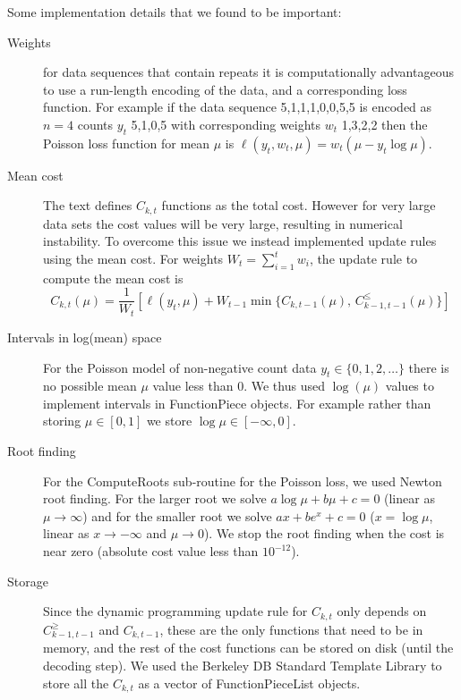 \documentclass{article}
\begin{document}
Some implementation details that we found to be important:
\begin{description}
\item[Weights] for data sequences that contain repeats it is
  computationally advantageous to use a run-length encoding of the
  data, and a corresponding loss function. For example if the data
  sequence 5,1,1,1,0,0,5,5 is encoded as $n=4$ counts $y_t$ 5,1,0,5 with
  corresponding weights $w_t$ 1,3,2,2 then the Poisson loss function
  for mean $\mu$ is $\ell(y_t, w_t, \mu) = w_t(\mu- y_t\log \mu)$.
\item[Mean cost] The text defines $C_{k,t}$ functions as the total
  cost. However for very large data sets the cost values will be very
  large, resulting in numerical instability. To overcome this issue we
  instead implemented update rules using the mean cost.  For weights
  $W_{t}=\sum_{i=1}^t w_i$, the update rule to compute the mean cost is
$$  C_{k,t}(\mu) = \frac{1}{W_{t}} \left[\ell(y_t, \mu) + 
W_{t-1}
\min\{ C_{k,t-1}(\mu),\, C_{k-1,t-1}^\leq(\mu)  \}\right]$$
\item[Intervals in log(mean) space] For the Poisson model of
  non-negative count data $y_t\in\{0,1,2,\dots\}$ there is no possible
  mean $\mu$ value less than 0. We thus used $\log(\mu)$ values to
  implement intervals in FunctionPiece objects. For example rather
  than storing $\mu\in[0,1]$ we store $\log\mu\in[-\infty, 0]$.
\item[Root finding] For the ComputeRoots sub-routine for the Poisson
  loss, we used Newton root finding. For the larger root we solve
  $a\log\mu + b\mu + c = 0$ (linear as $\mu\rightarrow\infty$) and for
  the smaller root we solve $a x + be^x + c = 0$ ($x=\log \mu$, linear
  as $x\rightarrow -\infty$ and $\mu\rightarrow 0$). We stop the root
  finding when the cost is near zero (absolute cost value less
  than $10^{-12}$).
\item[Storage] Since the dynamic programming update rule for $C_{k,t}$
  only depends on $C_{k-1,t-1}^\geq$ and $C_{k,t-1}$, these are the
  only functions that need to be in memory, and the rest of the cost
  functions can be stored on disk (until the decoding step). We used
  the Berkeley DB Standard Template Library to store all the $C_{k,t}$
  as a vector of FunctionPieceList objects.
\end{description}
\end{document}

